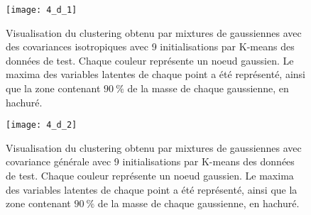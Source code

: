 \documentclass[12pt,a4paper,onecolumn]{article}
\begin{document}
\begin{figure}[H]
	\centering
	\texttt{[image: 4\_d\_1]}
	\caption{Visualisation du clustering obtenu par mixtures de gaussiennes avec des covariances isotropiques avec 9 initialisations par K-means des données de test. Chaque couleur représente un noeud gaussien. Le maxima des variables latentes de chaque point a été représenté, ainsi que la zone contenant \(90~\%\) de la masse de chaque gaussienne, en hachuré.}
	\label{fig_4_d_1}
\end{figure}


\begin{figure}[H]
	\centering
	\texttt{[image: 4\_d\_2]}
	\caption{Visualisation du clustering obtenu par mixtures de gaussiennes avec covariance générale avec 9 initialisations par K-means des données de test. Chaque couleur représente un noeud gaussien. Le maxima des variables latentes de chaque point a été représenté, ainsi que la zone contenant \(90~\%\) de la masse de chaque gaussienne, en hachuré.}
	\label{fig_4_d_2}
\end{figure}
\end{document}
